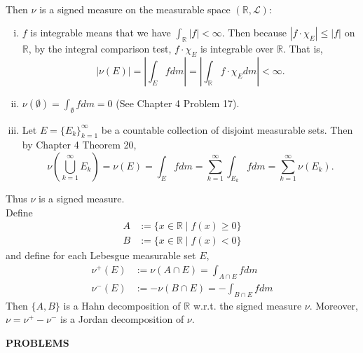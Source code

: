 \begin{flushleft}
	\\Then $\nu$ is a signed measure on the measurable space $(\mathbb{R},\mathcal{L})$:
	\begin{enumerate}[(i)]
		\item $f$ is integrable means that we have $\int_\mathbb{R}|f|<\infty$.
		Then because $|f\cdot\chi_E|\le|f|$ on $\mathbb{R}$, by the integral comparison test, $f\cdot\chi_E$ is integrable over $\mathbb{R}$.
		That is,
		\[
			|\nu(E)|=\left|\int_Efdm\right|=\left|\int_\mathbb{R}f\cdot\chi_Edm\right|<\infty.
		\]
		\item $\nu(\emptyset)=\int_\emptyset f dm=0$ (See Chapter 4 Problem 17).
		\item Let $E=\{E_k\}_{k=1}^\infty$ be a countable collection of disjoint measurable sets.
		Then by Chapter 4 Theorem 20,
		\[
			\nu\left(\bigcup_{k=1}^\infty E_k\right)=\nu(E)=\int_{E}fdm=\sum_{k=1}^\infty\int_{E_k}fdm=\sum_{k=1}^\infty\nu(E_k).
		\]
	\end{enumerate}
	Thus $\nu$ is a signed measure.
	\\Define 
	\begin{align*}
		A&:=\{x\in\mathbb{R}\mid f(x)\ge0\}\\
		B&:=\{x\in\mathbb{R}\mid f(x)<0\}
	\end{align*}
	and define for each Lebesgue measurable set $E$,
	\begin{align*}
		\nu^+(E)&:=\nu(A\cap E)=\int_{A\cap E} f dm\\
		\nu^-(E)&:=-\nu(B\cap E)=-\int_{B\cap E} f dm
	\end{align*}
	Then $\{A,B\}$ is a Hahn decomposition of $\mathbb{R}$ w.r.t. the signed measure $\nu$.
	Moreover, $\nu=\nu^+-\nu^-$ is a Jordan decomposition of $\nu$.
\end{flushleft}
\begin{center}
	\textbf{PROBLEMS}
\end{center}
